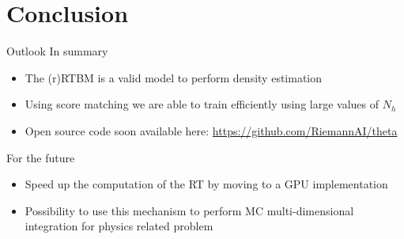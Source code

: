 \documentclass[10pt]{beamer}
\begin{document}
\section{Conclusion}

\begin{frame}{Outlook}
    In summary
    \begin{itemize}
        \item The (r)RTBM is a valid model to perform density estimation
        \item Using score matching we are able to train efficiently using large values of $N_h$
        \item Open source code soon available here: \url{https://github.com/RiemannAI/theta}
    \end{itemize}
    
    For the future
    \begin{itemize}
        \item Speed up the computation of the RT by moving to a GPU implementation
        \item Possibility to use this mechanism to perform MC multi-dimensional integration for physics related problem
    \end{itemize}
\end{frame}




\end{document}
